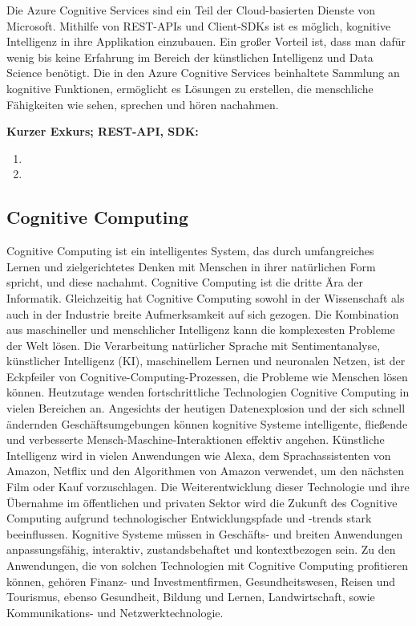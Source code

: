 Die Azure Cognitive Services sind ein Teil der Cloud-basierten Dienste von Microsoft. Mithilfe von REST-APIs und Client-SDKs ist es möglich, kognitive Intelligenz in ihre Applikation einzubauen. Ein großer Vorteil ist, dass man dafür wenig bis keine Erfahrung im Bereich der künstlichen Intelligenz und Data Science benötigt. Die in den Azure Cognitive Services beinhaltete Sammlung an kognitive Funktionen, ermöglicht es Lösungen zu erstellen, die menschliche Fähigkeiten wie sehen, sprechen und hören nachahmen.

\textbf{Kurzer Exkurs; REST-API, SDK:}

\begin{enumerate}
    \item 
    \item 
\end{enumerate}

\subsection{Cognitive Computing}

Cognitive Computing ist ein intelligentes System, das durch umfangreiches Lernen und zielgerichtetes Denken mit Menschen in ihrer natürlichen Form spricht, und diese nachahmt. Cognitive Computing ist die dritte Ära der Informatik. Gleichzeitig hat Cognitive Computing sowohl in der Wissenschaft als auch in der Industrie breite Aufmerksamkeit auf sich gezogen. Die Kombination aus maschineller und menschlicher Intelligenz kann die komplexesten Probleme der Welt lösen. Die Verarbeitung natürlicher Sprache mit Sentimentanalyse, künstlicher Intelligenz (KI), maschinellem Lernen und neuronalen Netzen, ist der Eckpfeiler von Cognitive-Computing-Prozessen, die Probleme wie Menschen lösen können. Heutzutage wenden fortschrittliche Technologien Cognitive Computing in vielen Bereichen an. Angesichts der heutigen Datenexplosion und der sich schnell ändernden Geschäftsumgebungen können kognitive Systeme intelligente, fließende und verbesserte Mensch-Maschine-Interaktionen effektiv angehen. Künstliche Intelligenz wird in vielen Anwendungen wie Alexa, dem Sprachassistenten von Amazon, Netflix und den Algorithmen von Amazon verwendet, um den nächsten Film oder Kauf vorzuschlagen. Die Weiterentwicklung dieser Technologie und ihre Übernahme im öffentlichen und privaten Sektor wird die Zukunft des Cognitive Computing aufgrund technologischer Entwicklungspfade und -trends stark beeinflussen. Kognitive Systeme müssen in Geschäfts- und breiten Anwendungen anpassungsfähig, interaktiv, zustandsbehaftet und kontextbezogen sein. Zu den Anwendungen, die von solchen Technologien mit Cognitive Computing profitieren können, gehören Finanz- und Investmentfirmen, Gesundheitswesen, Reisen und Tourismus, ebenso Gesundheit, Bildung und Lernen, Landwirtschaft, sowie Kommunikations- und Netzwerktechnologie.

